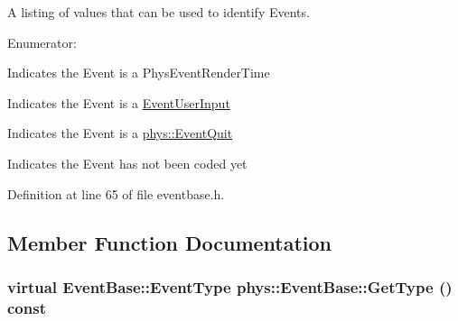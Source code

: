 A listing of values that can be used to identify Events. \begin{Desc}
\item[Enumerator: ]\par
\begin{description}
\item[{\em 
\hypertarget{classphys_1_1EventBase_a5e6a8564e127f654123f0bf6a2751923acdfa47d279e8a1c460d557d14b85c7a5}{
RenderTime}
\label{dd/d80/classphys_1_1EventBase_a5e6a8564e127f654123f0bf6a2751923acdfa47d279e8a1c460d557d14b85c7a5}
}]Indicates the Event is a PhysEventRenderTime \item[{\em 
\hypertarget{classphys_1_1EventBase_a5e6a8564e127f654123f0bf6a2751923a320cc0817dc2c2201501b12c50c89bef}{
UserInput}
\label{dd/d80/classphys_1_1EventBase_a5e6a8564e127f654123f0bf6a2751923a320cc0817dc2c2201501b12c50c89bef}
}]Indicates the Event is a \hyperlink{classphys_1_1EventUserInput}{EventUserInput} \item[{\em 
\hypertarget{classphys_1_1EventBase_a5e6a8564e127f654123f0bf6a2751923a84742ff55e9abdde8f5e0578d30f73a9}{
QuitMessage}
\label{dd/d80/classphys_1_1EventBase_a5e6a8564e127f654123f0bf6a2751923a84742ff55e9abdde8f5e0578d30f73a9}
}]Indicates the Event is a \hyperlink{classphys_1_1EventQuit}{phys::EventQuit} \item[{\em 
\hypertarget{classphys_1_1EventBase_a5e6a8564e127f654123f0bf6a2751923a18594400c60af959158e9f5cc2cd5d08}{
SystemMessage}
\label{dd/d80/classphys_1_1EventBase_a5e6a8564e127f654123f0bf6a2751923a18594400c60af959158e9f5cc2cd5d08}
}]Indicates the Event has not been coded yet \end{description}
\end{Desc}



Definition at line 65 of file eventbase.h.



\subsection{Member Function Documentation}
\hypertarget{classphys_1_1EventBase_a1b3d29b6ecf30f18cc3e1825a515c508}{
\subsubsection[{GetType}]{\setlength{\rightskip}{0pt plus 5cm}virtual {\bf EventBase::EventType} phys::EventBase::GetType () const}}
\label{dd/d80/classphys_1_1EventBase_a1b3d29b6ecf30f18cc3e1825a515c508}



